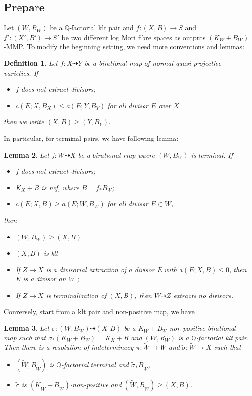 \documentclass{article}
\newtheorem{defn}{Definition}[subsection]
\newtheorem{lem}[defn]{Lemma}
\begin{document}
\subsection{Prepare}
Let $(W,B_W)$ be a $\mathbb{Q}$-factorial klt pair and $f:(X,B)\to S$ and $f':(X',B')\to S'$ be two different log Mori fibre spaces as outputs $(K_{W}+B_{W})$-MMP.  To modify the beginning setting, we need more conventions and lemmas:
\begin{defn}
Let $f:X\dashrightarrow Y$ be a birational map of normal quasi-projective varieties. If
\begin{itemize}
  \item $f$ does not extract divisors;
  \item $a(E;X,B_{X})\leqslant a(E;Y,B_{Y})$ for all divisor  $E$  over $X$.
\end{itemize}
then we write $(X,B)\geqslant (Y,B_{Y})$.
\end{defn}
In particular, for terminal pairs, we have following lemma: 
\begin{lem}\label{terminalorder}
\cite[Lemma 13.8]{haconMinimalModelProgram2012} Let $f:W\dashrightarrow X$ be a birational map where $(W,B_W)$ is terminal. If
\begin{itemize}
  \item $f$ does not extract divisors;
  \item $K_X+B$ is nef, where $B=f_*B_W$;
  \item $a(E;X,B)\geqslant a(E;W,B_W)$ for all divisor $E \subset W$,
\end{itemize}
then
\begin{itemize}
  \item $(W,B_W)\geqslant (X,B)$.
  \item $(X,B)$ is klt
  \item If $Z\to X$ is a divisorial extraction of a divisor $E$ with $a(E;X,B)\leqslant 0$, then $E$ is a divisor on $W$ ;
  \item If $Z\to X$ is terminalization of $(X,B)$, then $W\dashrightarrow Z$ extracts no divisors.
\end{itemize}
\end{lem}
Conversely, start from a klt pair and non-positive map, we have
\begin{lem}\label{terminalresolution}
  \cite[Lemma 3.5]{liuSarkisovProgramGeneralized2019} Let $\sigma:(W,B_W)\dashrightarrow (X,B)$ be a $K_W+B_W$-non-positive birational map such that $\sigma_*(K_W+B_W)=K_X+B$ and $(W,B_W)$ is a $\mathbb{Q}$-factorial klt pair. Then there is a resolution of indeterminacy $\pi:\tilde{W}\to W $ and $\tilde{\sigma}:\tilde{W}\to X$ such that
\begin{itemize}
  \item $(\tilde{W},B_{\tilde{W}})$ is $\mathbb{Q}$-factorial terminal and $\tilde{\sigma}_*B_{\tilde{W}}$,
  \item $\tilde{\sigma}$ is $(K_{\tilde{W}}+B_{\tilde{W}})$-non-positive and $(\tilde{W},B_{\tilde{W}})\geqslant (X,B)$.
\end{itemize}
\end{lem}
\end{document}
